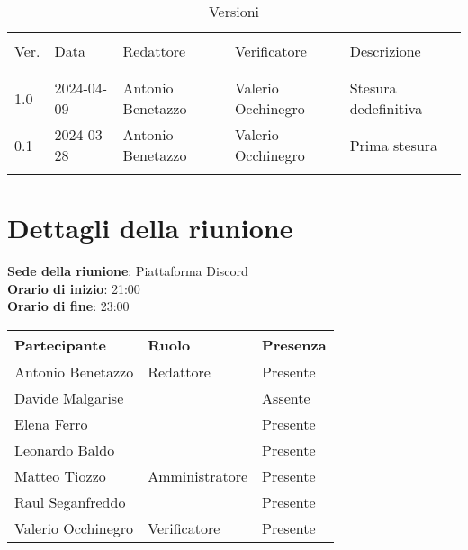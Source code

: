 \documentclass[italian,12pt]{article} %
\begin{document}


\newpage



\begin{table}[!h]
	\caption{Versioni}
	\footnotesize
	\begin{center}
		\begin{tabular}{ l l l l l }
			\hline                                                                            \\[-2ex]
			Ver. & Data       & Redattore         & Verificatore       & Descrizione          \\
			\\[-2ex] \hline \\[-1.5ex]
			1.0  & 2024-04-09 & Antonio Benetazzo & Valerio Occhinegro & Stesura dedefinitiva \\
			0.1  & 2024-03-28 & Antonio Benetazzo & Valerio Occhinegro & Prima stesura        \\
			\\[-1.5ex] \hline
		\end{tabular}
	\end{center}
\end{table}

\newpage

\tableofcontents

\newpage

\section{Dettagli della riunione}


\textbf{Sede della riunione}: Piattaforma Discord\\
\textbf{Orario di inizio}: 21:00\\
\textbf{Orario di fine}: 23:00\\


\begin{flushleft}
	\begin{table}[!h]
		\begin{tabular}{ |l|l|l| }
			\hline
			\textbf{Partecipante} & \textbf{Ruolo} & \textbf{Presenza} \\
			\hline
			Antonio Benetazzo     & Redattore      & Presente          \\
			Davide Malgarise      &                & Assente           \\
			Elena Ferro           &                & Presente          \\
			Leonardo Baldo        &                & Presente          \\
			Matteo Tiozzo         & Amministratore & Presente          \\
			Raul Seganfreddo      &                & Presente          \\
			Valerio Occhinegro    & Verificatore   & Presente          \\
			\hline
		\end{tabular}
	\end{table}
\end{flushleft}
\end{document}
